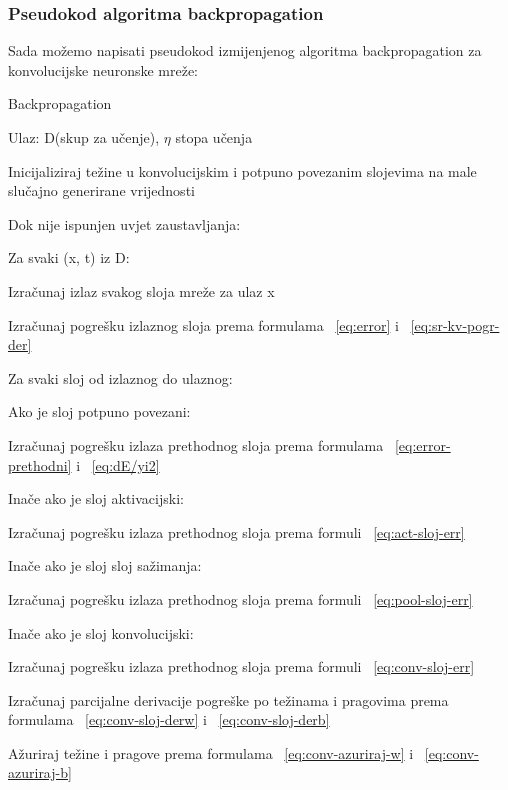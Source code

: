 \documentclass[times, utf8, zavrsni, numeric]{fer}
\begin{document}
\subsubsection{Pseudokod algoritma backpropagation}
Sada možemo napisati pseudokod izmijenjenog algoritma backpropagation za konvolucijske neuronske mreže:
\begin{algorithm}
\caption{Backpropagation}
\label{alg:backpropagation}
Ulaz: D(skup za učenje), $\eta$ stopa učenja

Inicijaliziraj težine u konvolucijskim i potpuno povezanim slojevima na male slučajno generirane vrijednosti\;

Dok nije ispunjen uvjet zaustavljanja:\;

Za svaki (x, t) iz D:

Izračunaj izlaz svakog sloja mreže za ulaz x

Izračunaj pogrešku izlaznog sloja prema formulama ~\ref{eq:error} i ~\ref{eq:sr-kv-pogr-der}

Za svaki sloj od izlaznog do ulaznog:

Ako je sloj potpuno povezani:

Izračunaj pogrešku izlaza prethodnog sloja prema formulama ~\ref{eq:error-prethodni} i ~\ref{eq:dE/yi2}

Inače ako je sloj aktivacijski:

Izračunaj pogrešku izlaza prethodnog sloja prema formuli ~\ref{eq:act-sloj-err}

Inače ako je sloj sloj sažimanja:

Izračunaj pogrešku izlaza prethodnog sloja prema formuli ~\ref{eq:pool-sloj-err}

Inače ako je sloj konvolucijski:

Izračunaj pogrešku izlaza prethodnog sloja prema formuli ~\ref{eq:conv-sloj-err}

Izračunaj parcijalne derivacije pogreške po težinama i pragovima prema formulama ~\ref{eq:conv-sloj-derw} i ~\ref{eq:conv-sloj-derb}

Ažuriraj težine i pragove prema formulama ~\ref{eq:conv-azuriraj-w} i ~\ref{eq:conv-azuriraj-b}
 	
\end{algorithm}
\end{document}
